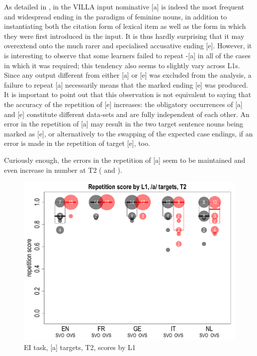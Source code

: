As detailed in , in the VILLA input nominative [a] is indeed the most frequent and widespread ending in the paradigm of feminine nouns, in addition to instantiating both the citation form of lexical item as well as the form in which they were first introduced in the input. It is thus hardly surprising that it may overextend onto the much rarer and specialised accusative ending [e]. However, it is interesting to observe that some learners failed to repeat -[a] in all of the cases in which it was required; this tendency also seems to slightly vary across L1s. Since any output different from either [a] or [e] was excluded from the analysis, a failure to repeat [a] necessarily means that the marked ending [e] was produced. It is important to point out that this observation is not equivalent to saying that the accuracy of the repetition of [e] increases: the obligatory occurrences of [a] and [e] constitute different data-sets and are fully independent of each other. An error in the repetition of [a] may result in the two target sentence nouns being marked as [e], or alternatively to the swapping of the expected case endings, if an error is made in the repetition of target [e], too.

Curiously enough, the errors in the repetition of [a] seem to be maintained and even increase in number at T2 ( and ).

\begin{figure}
    \includegraphics[width=\textwidth]{figures/04-7.pdf}
    \caption{EI task, [a] targets, T2, scores by L1}
    \label{fig:04:7}
\end{figure}

